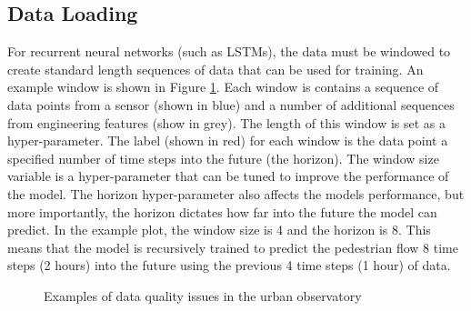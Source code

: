 \subsection{Data Loading}
\label{subsubsection: des_data_loading}

For recurrent neural networks (such as LSTMs), the data must be windowed to create standard length sequences of data that can be used for training. An example window is shown in Figure \ref{fig:dataloader_example_training_sequence}. Each window is contains a sequence of data points from a sensor (shown in blue) and a number of additional sequences from engineering features (show in grey). The length of this window is set as a hyper-parameter. The label (shown in red) for each window is the data point a specified number of time steps into the future (the horizon). The window size variable is a hyper-parameter that can be tuned to improve the performance of the model. The horizon hyper-parameter also affects the models performance, but more importantly, the horizon dictates how far into the future the model can predict. In the example plot, the window size is 4 and the horizon is 8. This means that the model is recursively trained to predict the pedestrian flow 8 time steps (2 hours) into the future using the previous 4 time steps (1 hour) of data.

\begin{figure}[H]
    \centering
    \caption{Examples of data quality issues in the urban observatory}
    \label{fig:dataloader_example_training_sequence}
\end{figure}

